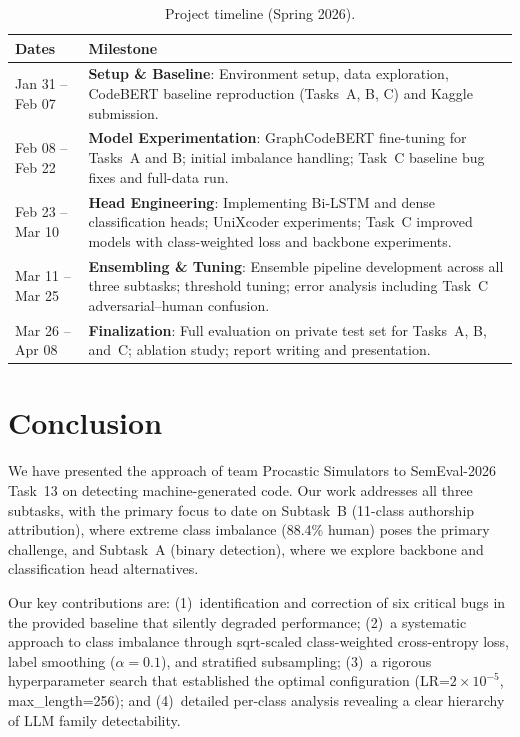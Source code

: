 \documentclass[11pt]{article}
\begin{document}
\begin{table}[ht]
\centering
\small
\begin{tabularx}{\columnwidth}{@{}l X@{}}
\toprule
\textbf{Dates} & \textbf{Milestone} \\ \midrule
Jan 31 -- Feb 07 & \textbf{Setup \& Baseline}: Environment setup, data exploration, CodeBERT baseline reproduction (Tasks~A, B, C) and Kaggle submission. \\ \addlinespace[0.5ex]
Feb 08 -- Feb 22 & \textbf{Model Experimentation}: GraphCodeBERT fine-tuning for Tasks~A and B; initial imbalance handling; Task~C baseline bug fixes and full-data run. \\ \addlinespace[0.5ex]
Feb 23 -- Mar 10 & \textbf{Head Engineering}: Implementing Bi-LSTM and dense classification heads; UniXcoder experiments; Task~C improved models with class-weighted loss and backbone experiments. \\ \addlinespace[0.5ex]
Mar 11 -- Mar 25 & \textbf{Ensembling \& Tuning}: Ensemble pipeline development across all three subtasks; threshold tuning; error analysis including Task~C adversarial--human confusion. \\ \addlinespace[0.5ex]
Mar 26 -- Apr 08 & \textbf{Finalization}: Full evaluation on private test set for Tasks~A, B, and~C; ablation study; report writing and presentation. \\ \bottomrule
\end{tabularx}
\caption{Project timeline (Spring 2026).}
\label{tab:timeline}
\end{table}

\section{Conclusion}
\label{sec:conclusion}

We have presented the approach of team Procastic Simulators to SemEval-2026 Task~13 on detecting machine-generated code. Our work addresses all three subtasks, with the primary focus to date on Subtask~B (11-class authorship attribution), where extreme class imbalance (88.4\% human) poses the primary challenge, and Subtask~A (binary detection), where we explore backbone and classification head alternatives.

Our key contributions are: (1)~identification and correction of six critical bugs in the provided baseline that silently degraded performance; (2)~a systematic approach to class imbalance through sqrt-scaled class-weighted cross-entropy loss, label smoothing ($\alpha = 0.1$), and stratified subsampling; (3)~a rigorous hyperparameter search that established the optimal configuration (LR=$2{\times}10^{-5}$, max\_length=256); and (4)~detailed per-class analysis revealing a clear hierarchy of LLM family detectability.
\end{document}
